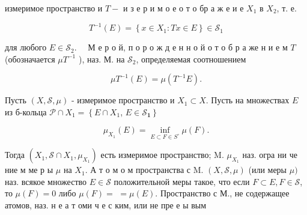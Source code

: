\documentclass[10pt]{article}
\begin{document}
измеримое пространство и $T-$ и з е р и м о е о т о бр а ж е и е $X_{1}$ в $X_{2}$, т. е.



\[

T^{-1}(E)=\left\{x \in X_{1}: T x \in E\right\} \in \mathscr{S}_{1}

\]



для любого $E \in \mathscr{S}_{2} . \quad$ М е р о й, п о р о ж д е н н о й о т о б р а же н и е м $T$ (обозначается $\mu T^{-1}$ ), наз. М. на $\mathscr{S}_{2}$, определяемая соотношением



\[

\mu T^{-1}(E)=\mu\left(T^{-1} E\right) .

\]



Пусть $(X, \mathscr{S}, \mu)$ - измеримое пространство и $X_{1} \subset X$. Пусть на множествах $E$ из б-кольца $\mathscr{P} \cap X_{1}=\left\{E \cap X_{1}\right.$, $\left.E \in \mathscr{S}_{\mathbf{1}}\right\}$



\[

\mu_{X_{1}}(E)=\inf _{E \subset F \in S^{\circ}} \mu(F) .

\]



Тогда $\left(X_{1}, \mathscr{S} \cap X_{1}, \mu_{X_{1}}\right)$ есть измеримое пространство; M. $\mu_{X_{1}}$ наз. огра ни че ние м ме р ы $\mu$ на $X_{1}$. А т о м о м пространства с M. $(X, \mathscr{S}, \mu)$ (или меры $\mu)$ наз. всякое множество $E \in \mathscr{S}$ положительной меры такое, что если $F \subset E, F \in \mathscr{\mathscr { S }}$, то $\mu(F)=0$ либо $\mu(F)=$ $=\mu(E)$. Пространство с М., не содержащее атомов, наз. н е а т оми ч е с ким, или не пре е ы вым
\end{document}
